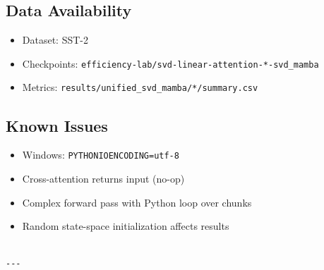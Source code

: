 \subsection{Data Availability}

\begin{itemize}
\item Dataset: SST-2
\item Checkpoints: \texttt{efficiency-lab/svd-linear-attention-*-svd\_mamba}
\item Metrics: \texttt{results/unified\_svd\_mamba/*/summary.csv}

\end{itemize}
\subsection{Known Issues}

\begin{itemize}
\item Windows: \texttt{PYTHONIOENCODING=utf-8}
\item Cross-attention returns input (no-op)
\item Complex forward pass with Python loop over chunks
\item Random state-space initialization affects results
\end{itemize}
\begin{lstlisting}

---
\end{lstlisting}
